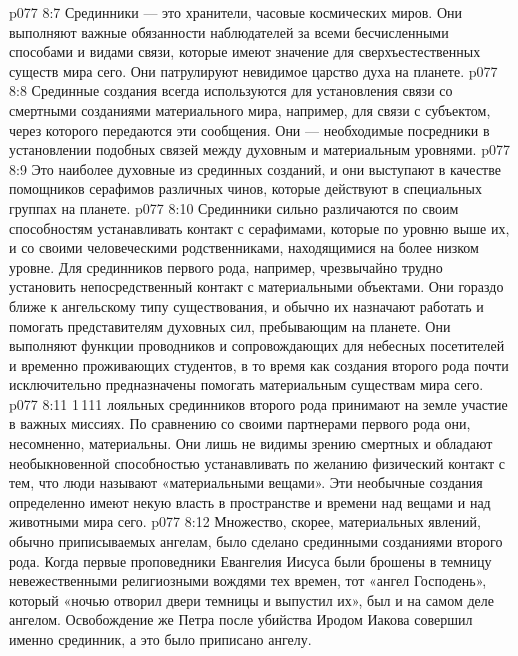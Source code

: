 \vs p077 8:7 \bibnobreakspace {} Срединники --- это хранители, часовые космических миров. Они выполняют важные обязанности наблюдателей за всеми бесчисленными способами и видами связи, которые имеют значение для сверхъестественных существ мира сего. Они патрулируют невидимое царство духа на планете.
\vs p077 8:8 \bibnobreakspace {} Срединные создания всегда используются для установления связи со смертными созданиями материального мира, например, для связи с субъектом, через которого передаются эти сообщения. Они --- необходимые посредники в установлении подобных связей между духовным и материальным уровнями.
\vs p077 8:9 \bibnobreakspace {} Это наиболее духовные из срединных созданий, и они выступают в качестве помощников серафимов различных чинов, которые действуют в специальных группах на планете.
\vs p077 8:10 \pc Срединники сильно различаются по своим способностям устанавливать контакт с серафимами, которые по уровню выше их, и со своими человеческими родственниками, находящимися на более низком уровне. Для срединников первого рода, например, чрезвычайно трудно установить непосредственный контакт с материальными объектами. Они гораздо ближе к ангельскому типу существования, и обычно их назначают работать и помогать представителям духовных сил, пребывающим на планете. Они выполняют функции проводников и сопровождающих для небесных посетителей и временно проживающих студентов, в то время как создания второго рода почти исключительно предназначены помогать материальным существам мира сего.
\vs p077 8:11 1\,111 лояльных срединников второго рода принимают на земле участие в важных миссиях. По сравнению со своими партнерами первого рода они, несомненно, материальны. Они лишь не видимы зрению смертных и обладают необыкновенной способностью устанавливать по желанию физический контакт с тем, что люди называют «материальными вещами». Эти необычные создания определенно имеют некую власть в пространстве и времени над вещами и над животными мира сего.
\vs p077 8:12 Множество, скорее, материальных явлений, обычно приписываемых ангелам, было сделано срединными созданиями второго рода. Когда первые проповедники Евангелия Иисуса были брошены в темницу невежественными религиозными вождями тех времен, тот «ангел Господень», который «ночью отворил двери темницы и выпустил их», был и на самом деле ангелом. Освобождение же Петра после убийства Иродом Иакова совершил именно срединник, а это было приписано ангелу.
